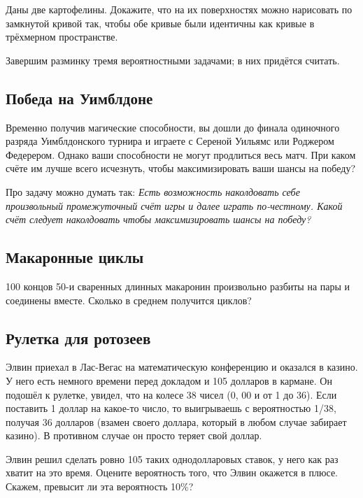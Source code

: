 Даны две картофелины.
Докажите, что на их поверхностях можно нарисовать по замкнутой кривой так, чтобы обе кривые были идентичны как кривые в трёхмерном пространстве.

\medskip

Завершим разминку тремя вероятностными задачами; в них придётся считать.

\subsection*{Победа на Уимблдоне}

Временно получив магические способности, вы дошли до финала одиночного разряда Уимблдонского турнира и играете с Сереной Уильямс или Роджером Федерером.
Однако ваши способности не могут продлиться весь матч.
При каком счёте им лучше всего исчезнуть, чтобы максимизировать ваши шансы на победу?

\begin{addedbytheeditors}
Про задачу можно думать так: 
\textit{Есть возможность наколдовать себе произвольный промежуточный счёт игры и далее играть по-честному.
Какой счёт следует наколдовать чтобы максимизировать шансы на победу?}\pr
\end{addedbytheeditors}



\subsection*{Макаронные циклы}

100 концов 50-и сваренных длинных макаронин произвольно разбиты на пары и соединены вместе.
Сколько в среднем получится циклов?

\subsection*{Рулетка для ротозеев}\label{Рулетка для ротозеев}

Элвин приехал в Лас-Вегас на математическую конференцию и оказался в казино.
У него есть немного времени перед докладом и 105 долларов в кармане.
Он подошёл к рулетке, увидел, что на колесе 38 чисел (0, 00 и от 1 до 36).
Если поставить 1 доллар на какое-то число, то выигрываешь с вероятностью 1/38, получая 36 долларов (взамен своего доллара, который в любом случае забирает казино).
В противном случае он просто теряет свой доллар.

Элвин решил сделать ровно 105 таких однодолларовых ставок, 
у него как раз хватит на это время.
Оцените вероятность того, что Элвин окажется в плюсе.
Скажем, превысит ли эта вероятность 10\%?
